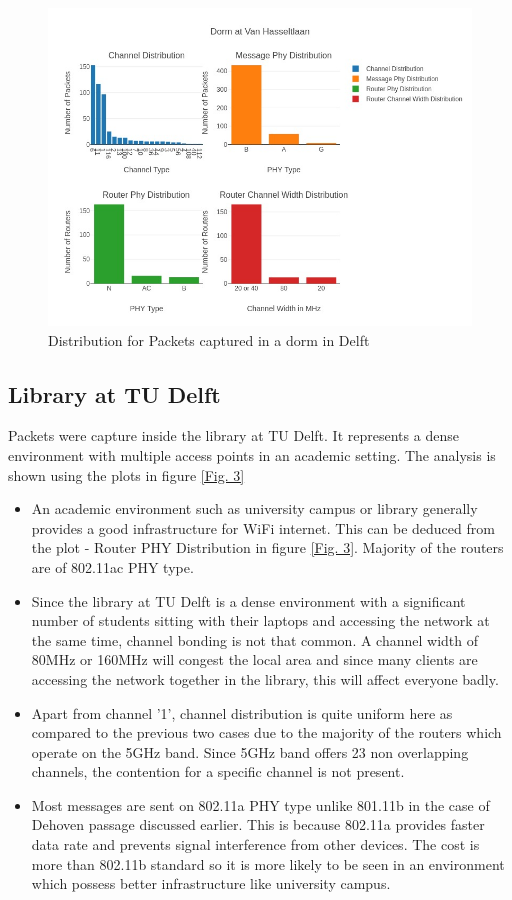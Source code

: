 \documentclass{article}
\begin{document}
\begin{figure}[h]
      	\centering
     	\includegraphics[scale=0.55]{Dorm at Van Hasseltlaan.jpeg}
      	\caption{Distribution for Packets captured in a dorm in Delft}
      	\label{Fig. 2}
\end{figure}

\subsection{Library at TU Delft}
Packets were capture inside the library at TU Delft. It represents a dense environment with multiple access points in an academic setting. The analysis is shown using the plots in figure \ref{Fig. 3}
\begin{itemize}
    \item An academic environment such as university campus or library generally provides a good infrastructure for WiFi internet. This can be deduced from the plot - Router PHY Distribution in figure \ref{Fig. 3}. Majority of the routers are of 802.11ac PHY type.
    
    \item Since the library at TU Delft is a dense environment with a significant number of students sitting with their laptops and accessing the network at the same time, channel bonding is not that common. A channel width of 80MHz or 160MHz will congest the local area and since many clients are accessing the network together in the library, this will affect everyone badly.
    
    \item Apart from channel '1', channel distribution is quite uniform here as compared to the previous two cases due to the majority of the routers which operate on the 5GHz band. Since 5GHz band offers 23 non overlapping channels, the contention for a specific channel is not present. 
    
    \item Most messages are sent on 802.11a PHY type unlike 801.11b in the case of Dehoven passage discussed earlier. This is because 802.11a provides faster data rate and prevents signal interference from other devices. The cost is more than 802.11b standard so it is more likely to be seen in an environment which possess better infrastructure like university campus.
\end{itemize}
\end{document}
